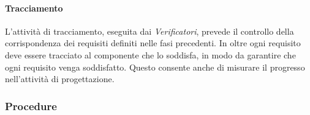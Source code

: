 			\paragraph{Tracciamento} %
			\label{par:tracciamento}
			L'attività di tracciamento, eseguita dai \emph{Verificatori}, prevede il controllo della corrispondenza dei requisiti definiti nelle fasi precedenti. In oltre ogni requisito deve essere tracciato al componente che lo soddisfa, in modo da garantire che ogni requisito venga soddisfatto. Questo consente anche di misurare il progresso nell'attività di progettazione.


		\subsubsection{Procedure}
		\label{ssub:procedure}

